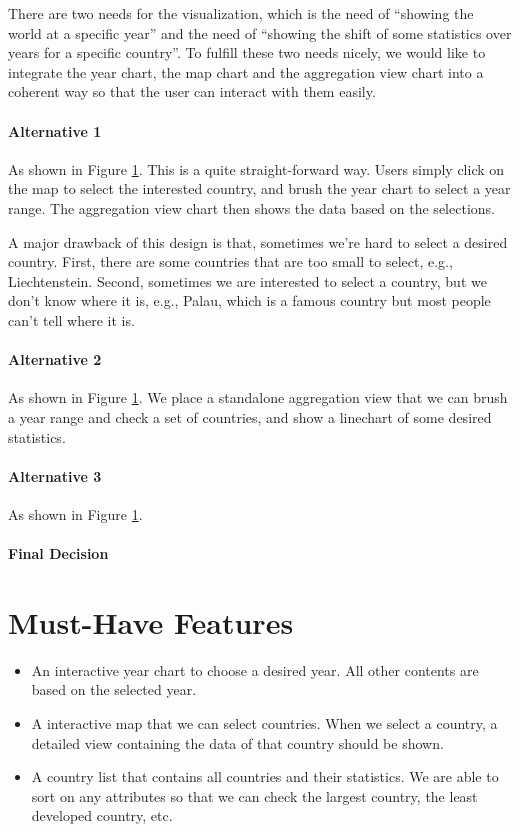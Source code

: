 \documentclass[12pt, fullpage,letterpaper]{article}
\begin{document}
There are two needs for the visualization, which is the need of  ``showing the world at a specific year'' and the need of ``showing the shift of some statistics over years for a specific country''.
To fulfill these two needs nicely, we would like to integrate the year chart, the map chart and the aggregation view chart into a coherent way so that the user can interact with them easily.

\paragraph{Alternative 1}
As shown in Figure \ref{}. 
This is a quite straight-forward way.
Users simply click on the map to select the interested country,
and brush the year chart to select a year range.
The aggregation view chart then shows the data based on the selections.

A major drawback of this design is that, sometimes we're hard to select a desired country.
First, there are some countries that are too small to select, e.g., Liechtenstein. Second, sometimes we are interested to select
a country, but we don't know where it is, e.g., Palau, which is a famous country but most people can't tell where it is.

\paragraph{Alternative 2}
As shown in Figure \ref{}.
We place a standalone aggregation view that we can brush a year range and check a set of countries, and
show a linechart of some desired statistics.

\paragraph{Alternative 3}
As shown in Figure \ref{}.

\paragraph{Final Decision}




\section{Must-Have Features}
\begin{itemize}
    \item An interactive year chart to choose a desired year. All other contents are based on the selected year.
    \item A interactive map that we can select countries. When we select a country, a detailed view containing the data of that country should be shown.
    \item A country list that contains all countries and their statistics. We are able to sort on any attributes so that we can check the largest country, the least developed country, etc.
\end{itemize}
\end{document}
